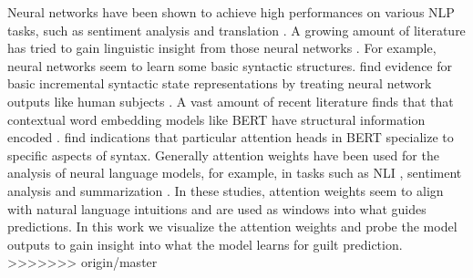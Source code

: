\documentclass[11pt,a4paper]{article}
\begin{document}
Neural networks have been shown to achieve high performances on various NLP tasks, such as sentiment analysis \cite{Socher:2013,Devlin:2018} and translation \cite{bahdanau2014neural}. A growing amount of literature has tried to gain linguistic insight from those neural networks \citep{belinkov2019analysis}.
For example, neural networks seem to learn some basic syntactic structures. \citeauthor{futrell-etal:2019-neural-language-models} find evidence for basic incremental syntactic state representations by treating neural network outputs like human subjects \citep{linzen2016assessing}. A vast amount of recent literature finds that that contextual word embedding models like BERT \citep{Devlin:2018} have structural information encoded \citep{jawahar-etal-2019-bert, Tenney:2019, clark2019what}. \citeauthor{clark2019what} find indications that particular attention heads in BERT specialize to specific aspects of syntax. Generally attention weights have been used for the analysis of neural language models, for example, in tasks such as NLI \citep{rocktaschel2015reasoning, yin2016abcnn}, sentiment analysis and \citep{wang2016attention, liu2017attention} summarization \citep{rush-etal-2015-neural, allamanis2016convolutional}. In these studies, attention weights seem to align with natural language intuitions and are used as windows into what guides predictions.
In this work we visualize the attention weights and probe the model outputs to gain insight into what the model learns for guilt prediction.
>>>>>>> origin/master




\end{document}
